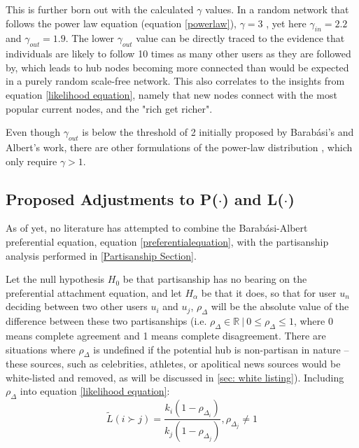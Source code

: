 \documentclass[preprint,review,12pt]{elsarticle}
\begin{document}
This is further born out with the calculated $\gamma$ values. In a random network that follows the power law equation (equation \ref{powerlaw}), $\gamma = 3$ \cite{barabasi2000scale,pastor2001epidemic}, yet here $\gamma_{in} = 2.2$ and $\gamma_{out} = 1.9$. The lower $\gamma_{out}$ value can be directly traced to the evidence that individuals are likely to follow 10 times as many other users as they are followed by, which leads to hub nodes becoming more connected than would be expected in a purely random scale-free network. This also correlates to the insights from equation \ref{likelihood equation}, namely that new nodes connect with the most popular current nodes, and the "rich get richer".

Even though $\gamma_{out}$ is below the threshold of 2 initially proposed by Barab{\'a}si's and Albert's work, there are other formulations of the power-law distribution \cite{ichinose2017invasion,albert1999diameter,mislove2007measurement,zhang2015exactly,pastor2002epidemic}, which only require $\gamma > 1$. 

\subsection{Proposed Adjustments to P($\cdot$) and L($\cdot$)}
As of yet, no literature has attempted to combine the Barab{\'a}si-Albert preferential equation, equation \ref{preferentialequation}, with the partisanship analysis performed in \ref{Partisanship Section}.

Let the null hypothesis $H_0$ be that partisanship has no bearing on the preferential attachment equation, and let $H_\alpha$ be that it does, so that for user $u_n$ deciding between two other users $u_i$ and $u_j$, $\rho_{\Delta}$ will be the absolute value of the difference between these two partisanships (i.e. $\rho_{\Delta} \in \mathbb{R} \ |\  0 \leq \rho_{\Delta} \leq 1$, where 0 means complete agreement and 1 means complete disagreement. There are situations where $\rho_{\Delta}$ is undefined if the potential hub is non-partisan in nature -- these sources, such as celebrities, athletes, or apolitical news sources would be white-listed and removed, as will be discussed in \ref{sec: white listing}). Including $\rho_\Delta$ into equation
\ref{likelihood equation}:
\begin{equation}
\label{Ldotpartisan}
        \tilde{L}(i \succ j)=\frac{k_i(1-\rho_{\Delta_i})}{k_j(1-\rho_{\Delta_j})},\rho_{\Delta_j}\neq 1 
\end{equation}
\end{document}
